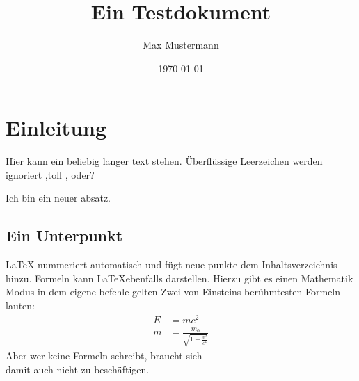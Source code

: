\documentclass{scrartcl} %
\title{Ein Testdokument}
\author{Max Mustermann}
\date{\today}
\begin{document}
\maketitle %
\tableofcontents %
\section{Einleitung}
 
Hier kann ein beliebig langer text stehen.       Überflüssige Leerzeichen werden ignoriert
,toll , oder?
 
Ich bin ein neuer absatz.

\subsection{Ein Unterpunkt}
 \LaTeX{} nummeriert automatisch und fügt neue punkte dem Inhaltsverzeichnis hinzu.
Formeln kann \LaTeX ebenfalls darstellen. Hierzu gibt es einen Mathematik Modus in dem eigene befehle gelten
Zwei von Einsteins berühmtesten Formeln lauten:
\begin{align} %
E &= mc^2                                  \\
m &= \frac{m_0}{\sqrt{1-\frac{v^2}{c^2}}}
\end{align}
Aber wer keine Formeln schreibt, braucht sich \\ %
damit auch nicht zu beschäftigen.
\end{document}
